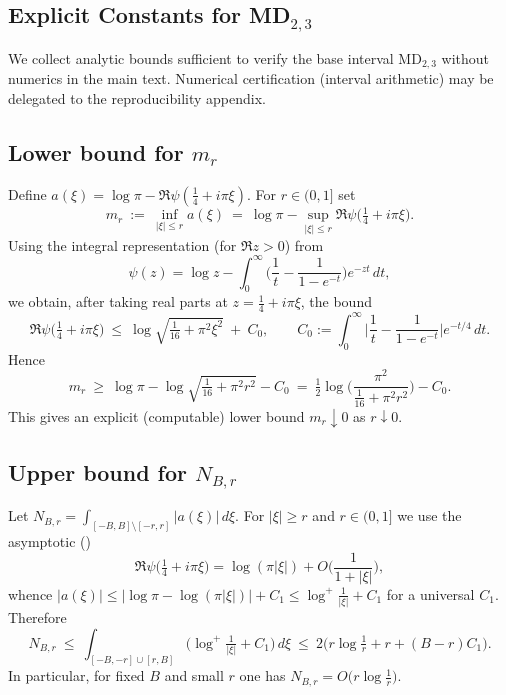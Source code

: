 \subsection{Explicit Constants for \texorpdfstring{MD$_{2,3}$}{MD₂,₃}}\label{app:md23-constants}
We collect analytic bounds sufficient to verify the base interval MD$_{2,3}$ without numerics in the main text. Numerical certification (interval arithmetic) may be delegated to the reproducibility appendix.

\subsection{Lower bound for \texorpdfstring{$m_r$}{m\_r}}
Define $a(\xi)=\log\pi-\Re\psi(\tfrac14+i\pi\xi)$. For $r\in(0,1]$ set
\begin{equation}\label{eq:MD_2_3_constants-formula-11}
m_r\ :=\ \inf_{|\xi|\le r} a(\xi)\ =\ \log\pi-\sup_{|\xi|\le r}\Re\psi\Big(\tfrac14+i\pi\xi\Big).
\end{equation}
Using the integral representation (for $\Re z>0$) from \cite[Ch.~2]{Titchmarsh1986}
\begin{equation}\label{eq:MD_2_3_constants-formula-12}
\psi(z)=\log z-\int_0^{\infty} \Big(\frac{1}{t}-\frac{1}{1-e^{-t}}\Big) e^{-zt}\,dt,
\end{equation}
we obtain, after taking real parts at $z=\tfrac14+i\pi\xi$, the bound
\begin{equation}\label{eq:MD_2_3_constants-formula-10}
\Re\psi\Big(\tfrac14+i\pi\xi\Big)\ \le\ \log\sqrt{\tfrac{1}{16}+\pi^2\xi^2}\ +\ C_0,\qquad C_0:=\int_0^{\infty}\Big|\frac{1}{t}-\frac{1}{1-e^{-t}}\Big| e^{-t/4}\,dt.
\end{equation}
Hence
\begin{equation}\label{eq:MD_2_3_constants-formula-9}
m_r\ \ge\ \log\pi-\log\sqrt{\tfrac{1}{16}+\pi^2 r^2}-C_0\ =\ \tfrac12\log\Big(\frac{\pi^2}{\tfrac{1}{16}+\pi^2 r^2}\Big)-C_0.
\end{equation}
This gives an explicit (computable) lower bound $m_r\downarrow 0$ as $r\downarrow0$.

\subsection{Upper bound for \texorpdfstring{$N_{B,r}$}{N\_B,r}}
Let $N_{B,r}=\int_{[-B,B]\setminus[-r,r]} |a(\xi)|\,d\xi$. For $|\xi|\ge r$ and $r\in(0,1]$ we use the asymptotic (\cite[Ch.~2]{Titchmarsh1986})
\begin{equation}\label{eq:MD_2_3_constants-formula-8}
\Re\psi\Big(\tfrac14+i\pi\xi\Big)=\log(\pi|\xi|)+O\Big(\frac{1}{1+|\xi|}\Big),
\end{equation}
whence $|a(\xi)|\le \big|\log\pi-\log(\pi|\xi|)\big|+C_1 \le \log^+\!\frac{1}{|\xi|}+C_1$ for a universal $C_1$. Therefore
\begin{equation}\label{eq:MD_2_3_constants-formula-7}
N_{B,r}\ \le\ \int_{[-B,-r]\cup[r,B]} \big(\log^+\!\tfrac{1}{|\xi|}+C_1\big)\,d\xi\ \le\ 2\Big( r\log\tfrac{1}{r}+r + (B-r)C_1\Big).
\end{equation}
In particular, for fixed $B$ and small $r$ one has $N_{B,r}=O\big(r\log\tfrac{1}{r}\big)$.


